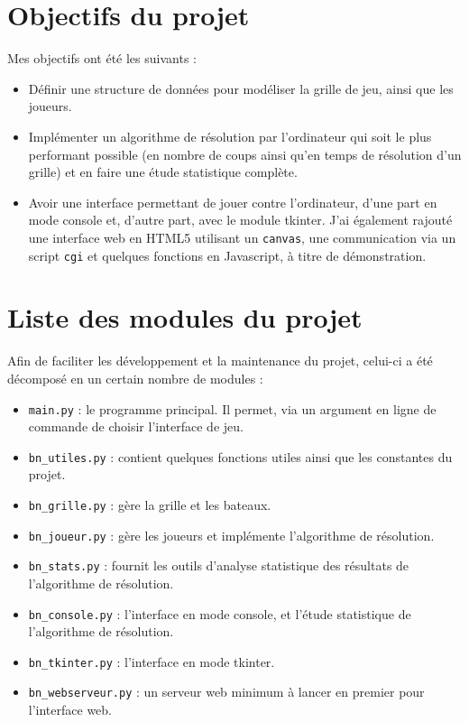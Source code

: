 \section{Objectifs du projet}
Mes objectifs ont été les suivants :
\begin{itemize}
\item Définir une structure de données pour modéliser la grille de jeu, ainsi que les joueurs.
\item Implémenter un algorithme de résolution par l'ordinateur qui soit le plus performant possible (en nombre de coups ainsi qu'en temps de résolution d'un grille) et en faire une étude statistique complète.
\item Avoir une interface permettant de jouer contre l'ordinateur, d'une part en mode console et, d'autre part, avec le module tkinter. J'ai également rajouté une interface web en HTML5 utilisant un \texttt{canvas}, une communication via un script \texttt{cgi} et quelques fonctions en Javascript, à titre de démonstration.
\end{itemize}

\section{Liste des modules du projet}
Afin de faciliter les développement et la maintenance du projet, celui-ci a été décomposé en un certain nombre de modules :
\begin{itemize}
\item \texttt{main.py} : le programme principal. Il permet, via un argument en ligne de commande de choisir l'interface de jeu.
\item \texttt{bn\_utiles.py} : contient quelques fonctions utiles ainsi que les constantes du projet.
\item \texttt{bn\_grille.py} : gère la grille et les bateaux.
\item \texttt{bn\_joueur.py} : gère les joueurs et implémente l'algorithme de résolution.
\item \texttt{bn\_stats.py} : fournit les outils d'analyse statistique des résultats de l'algorithme de résolution.
\item \texttt{bn\_console.py} : l'interface en mode console, et l'étude statistique de l'algorithme de résolution.
\item \texttt{bn\_tkinter.py} : l'interface en mode tkinter.
\item \texttt{bn\_webserveur.py} : un serveur web minimum à lancer en premier pour l'interface web.
\end{itemize}

